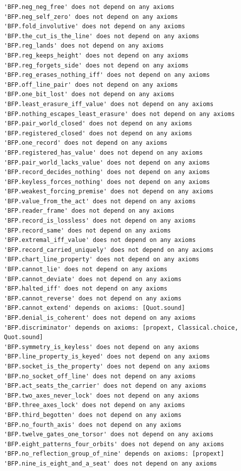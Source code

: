 \documentclass[10pt,twocolumn]{article}
\begin{document}
\begin{Verbatim}
'BFP.neg_neg_free' does not depend on any axioms
'BFP.neg_self_zero' does not depend on any axioms
'BFP.fold_involutive' does not depend on any axioms
'BFP.the_cut_is_the_line' does not depend on any axioms
'BFP.reg_lands' does not depend on any axioms
'BFP.reg_keeps_height' does not depend on any axioms
'BFP.reg_forgets_side' does not depend on any axioms
'BFP.reg_erases_nothing_iff' does not depend on any axioms
'BFP.off_line_pair' does not depend on any axioms
'BFP.one_bit_lost' does not depend on any axioms
'BFP.least_erasure_iff_value' does not depend on any axioms
'BFP.nothing_escapes_least_erasure' does not depend on any axioms
'BFP.pair_world_closed' does not depend on any axioms
'BFP.registered_closed' does not depend on any axioms
'BFP.one_record' does not depend on any axioms
'BFP.registered_has_value' does not depend on any axioms
'BFP.pair_world_lacks_value' does not depend on any axioms
'BFP.record_decides_nothing' does not depend on any axioms
'BFP.keyless_forces_nothing' does not depend on any axioms
'BFP.weakest_forcing_premise' does not depend on any axioms
'BFP.value_from_the_act' does not depend on any axioms
'BFP.reader_frame' does not depend on any axioms
'BFP.record_is_lossless' does not depend on any axioms
'BFP.record_same' does not depend on any axioms
'BFP.extremal_iff_value' does not depend on any axioms
'BFP.record_carried_uniquely' does not depend on any axioms
'BFP.chart_line_property' does not depend on any axioms
'BFP.cannot_lie' does not depend on any axioms
'BFP.cannot_deviate' does not depend on any axioms
'BFP.halted_iff' does not depend on any axioms
'BFP.cannot_reverse' does not depend on any axioms
'BFP.cannot_extend' depends on axioms: [Quot.sound]
'BFP.denial_is_coherent' does not depend on any axioms
'BFP.discriminator' depends on axioms: [propext, Classical.choice, Quot.sound]
'BFP.symmetry_is_keyless' does not depend on any axioms
'BFP.line_property_is_keyed' does not depend on any axioms
'BFP.socket_is_the_property' does not depend on any axioms
'BFP.no_socket_off_line' does not depend on any axioms
'BFP.act_seats_the_carrier' does not depend on any axioms
'BFP.two_axes_never_lock' does not depend on any axioms
'BFP.three_axes_lock' does not depend on any axioms
'BFP.third_begotten' does not depend on any axioms
'BFP.no_fourth_axis' does not depend on any axioms
'BFP.twelve_gates_one_torsor' does not depend on any axioms
'BFP.eight_patterns_four_orbits' does not depend on any axioms
'BFP.no_reflection_group_of_nine' depends on axioms: [propext]
'BFP.nine_is_eight_and_a_seat' does not depend on any axioms

\end{Verbatim}
\end{document}

